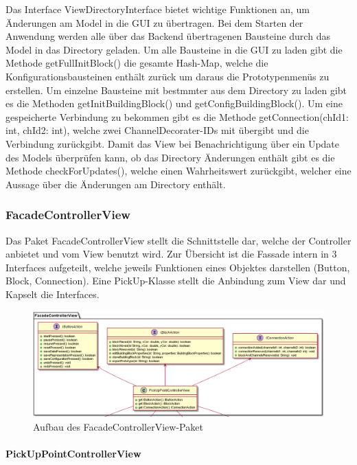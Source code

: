 \documentclass[parskip=full]{scrartcl}
\begin{document}
Das Interface ViewDirectoryInterface bietet wichtige Funktionen an, um Änderungen am Model in die GUI zu übertragen. 
Bei dem Starten der Anwendung werden alle über das Backend übertragenen Bausteine durch das Model in das Directory geladen. Um alle Bausteine in die GUI zu laden gibt die Methode getFullInitBlock() die gesamte Hash-Map, welche die Konfigurationsbausteinen enthält zurück um daraus die Prototypenmenüs zu erstellen. Um einzelne Bausteine mit bestmmter aus dem Directory zu laden gibt es die Methoden getInitBuildingBlock() und getConfigBuildingBlock(). Um eine gespeicherte Verbindung zu bekommen gibt es die Methode getConnection(chId1: int, chId2: int), welche zwei ChannelDecorater-IDs mit übergibt und die Verbindung zurückgibt.
Damit das View bei Benachrichtigung über ein Update des Models überprüfen kann, ob das Directory Änderungen enthält gibt es die Methode checkForUpdates(), welche einen Wahrheitswert zurückgibt, welcher eine Aussage über die Änderungen am Directory enthält.

\subsubsection{FacadeControllerView}

Das Paket FacadeControllerView stellt die Schnittstelle dar, welche der Controller anbietet und vom View benutzt wird. Zur Übersicht ist die Fassade intern in 3 Interfaces aufgeteilt, welche jeweils Funktionen eines Objektes darstellen (Button, Block, Connection). Eine PickUp-Klasse stellt die Anbindung zum View dar und Kapselt die Interfaces.

\begin{figure}[htbp]
	\begin{center}
		\includegraphics[width = 14 cm]{Grafiken/View/FacadeControllerViewNamespace.png}
		\caption{Aufbau des FacadeControllerView-Paket}
		\label{Entwurf_Grob}
	\end{center}
\end{figure}

\paragraph{PickUpPointControllerView}
\end{document}
